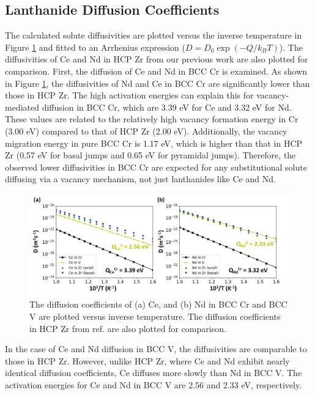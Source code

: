 \documentclass[preprint,12pt]{elsarticle}
\begin{document}
\FloatBarrier
\subsection{Lanthanide Diffusion Coefficients}
The calculated solute diffusivities are plotted versus the inverse temperature in Figure \ref{fig:diff_cr_v} and fitted to an Arrhenius expression ($D = D_0 \exp(-Q/k_BT)$). The diffusivities of Ce and Nd in HCP Zr from our previous work \cite{shousha2024first} are also plotted for comparison. First, the diffusion of Ce and Nd in BCC Cr is examined. As shown in Figure \ref{fig:diff_cr_v}, the diffusivities of Nd and Ce in BCC Cr are significantly lower than those in HCP Zr. The high activation energies can explain this for vacancy-mediated diffusion in BCC Cr, which are 3.39 eV for Ce and 3.32 eV for Nd. These values are related to the relatively high vacancy formation energy in Cr (3.00 eV) compared to that of HCP Zr (2.00 eV). Additionally, the vacancy migration energy in pure BCC Cr is 1.17 eV, which is higher than that in HCP Zr (0.57 eV for basal jumps and 0.65 eV for pyramidal jumps). Therefore, the observed lower diffusivities in BCC Cr are expected for any substitutional solute diffusing via a vacancy mechanism, not just lanthanides like Ce and Nd.

\begin{figure}[h!]
    \centering
    \includegraphics[width=0.9\linewidth]{diffusivities_cr_v.jpg}
    \caption{The diffusion coefficients of (a) Ce, and (b) Nd in BCC Cr and BCC V are plotted versus inverse temperature. The diffusion coefficients in HCP Zr from ref. \cite{shousha2024first} are also plotted for comparison.}
    \label{fig:diff_cr_v}
\end{figure}

In the case of Ce and Nd diffusion in BCC V, the diffusivities are comparable to those in HCP Zr. However, unlike HCP Zr, where Ce and Nd exhibit nearly identical diffusion coefficients, Ce diffuses more slowly than Nd in BCC V. The activation energies for Ce and Nd in BCC V are 2.56 and 2.33 eV, respectively. 
\end{document}
